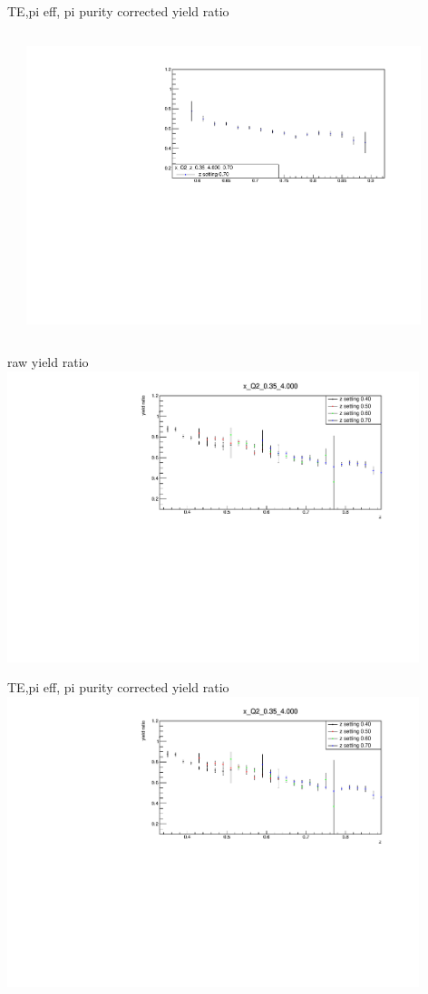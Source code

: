 \begin{frame}{TE,pi eff, pi purity corrected yield ratio}
\begin{columns}
\begin{column}[T]{0.5\textwidth}
\end{column}
\begin{column}[T]{0.5\textwidth}
\includegraphics[width = 0.9\textwidth]{results/yield/statistics_corr/x_Q2_z_0.35_4.000_0.70_ratio.pdf}
\end{column}
\end{columns}
\end{frame}
\begin{frame}{raw yield ratio}
\includegraphics[width = 0.9\textwidth]{results/yield/statistics/x_Q2_0.35_4.000_ratio.pdf}
\end{frame}
\begin{frame}{TE,pi eff, pi purity corrected yield ratio}
\includegraphics[width = 0.9\textwidth]{results/yield/statistics_corr/x_Q2_0.35_4.000_ratio.pdf}
\end{frame}
